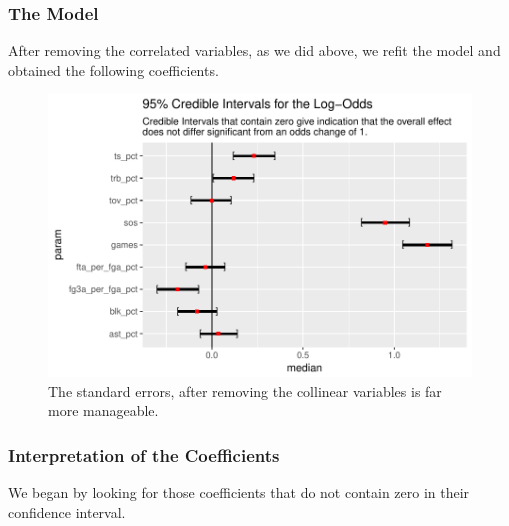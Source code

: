 \documentclass[10pt,a4paper, hidelinks]{article} %
\begin{document}
\subsubsection{The Model}

After removing the correlated variables, as we did above, we refit the model and obtained the following coefficients.

\begin{figure}[H]
	\centering
	
\end{figure}

\begin{figure}[H]
	\centering
	\includegraphics[width=1\linewidth]{../fig/polr_coef}
	\caption{The standard errors, after removing the collinear variables is far more manageable.}
	\label{fig:polr_coef}
\end{figure}


\subsubsection{Interpretation of the Coefficients}

We began by looking for those coefficients that do not contain zero in their confidence interval.
\end{document}
